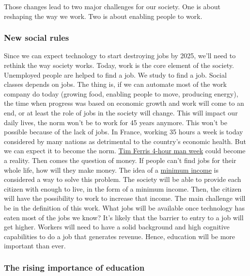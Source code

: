 \documentclass[12pt]{article}
\begin{document}
Those changes lead to two major challenges for our society. One is about
reshaping the way we work. Two is about enabling people to work.

\subsubsection{New social rules}

Since we can expect technology to start destroying jobs by 2025, we'll need to
rethink the way society works. Today, work is the core element of the society.
Unemployed people are helped to find a job. We study to find a job. Social
classes depends on jobs.
The thing is, if we can automate most of the work company do today (growing food,
enabling people to move, producing energy), the time when progress was based on
economic growth and work will come to an end, or at least the role of jobs in
the society will change.
This will impact our daily lives, the norm won't be to work for 45 years anymore.
This won't be possible because of the lack of jobs. In France, working 35 hours
a week is today considered by many nations as detrimental to the country's economic
health. But we can expect it to become the norm. \href{http://fourhourworkweek.com/}
{Tim Ferris 4-hour man week} could become a reality.
Then comes the question of money. If people can't find jobs for their whole life,
how will they make money. The idea of a
\href{http://www.globalresearch.ca/an-unconditional-citizens-income-a-basic-guaranteed-minimum-income/5423130}
{minimum income} is considered a way to solve this problem. The society will be
able to provide each citizen with enough to live, in the form of a minimum income.
Then, the citizen will have the possibility to work to increase that income.
The main challenge will be in the definition of this work. What jobs will be
available once technology has eaten most of the jobs we know? It's likely that
the barrier to entry to a job will get higher. Workers will need to have a solid
background and high cognitive capabilities to do a job that generates revenue.
Hence, education will be more important than ever.

\subsubsection{The rising importance of education}
\end{document}

